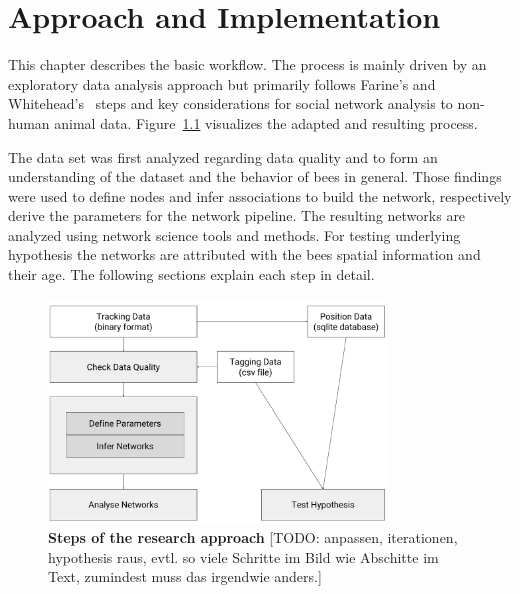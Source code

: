 \chapter{Approach and Implementation}
\label{ch:approach}

This chapter describes the basic workflow. The process is mainly driven by an exploratory data analysis approach but primarily follows  Farine's and Whitehead's~\cite{farine2015constructing} steps and key considerations for social network analysis to non-human animal data. Figure~\ref{fig:process} visualizes the adapted and resulting process.

The data set was first analyzed regarding data quality and to form an understanding of the dataset and the behavior of bees in general. Those findings were used to define nodes and infer associations to build the network, respectively derive the parameters for the network pipeline. The resulting networks are analyzed using network science tools and methods. For testing underlying hypothesis the networks are attributed with the bees spatial information and their age. The following sections explain each step in detail.


\begin{figure}[htb]
	\centering
	\includegraphics[width=0.8\textwidth]{Figures/process}
	\caption[Steps of the research approach]{\textbf{Steps of the research approach} [TODO: anpassen, iterationen, hypothesis raus, evtl. so viele Schritte im Bild wie Abschitte im Text, zumindest muss das irgendwie anders.]}
	\label{fig:process}
\end{figure}




